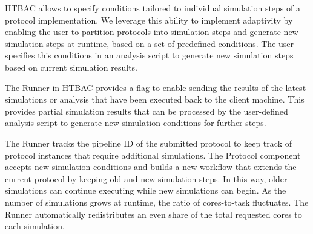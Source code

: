 HTBAC allows to specify conditions tailored to individual simulation steps of
a protocol implementation. We leverage this ability to implement adaptivity
by enabling the user to partition protocols into simulation steps and
generate new simulation steps at runtime, based on a set of predefined
conditions. The user specifies this conditions in an analysis script to
generate new simulation steps based on current simulation results.


The Runner in HTBAC provides a flag to enable sending the results of the
latest simulations or analysis that have been executed back to the client 
machine. This provides partial simulation results that can be processed by the
user-defined analysis script to generate new simulation conditions for further 
steps. 




The Runner tracks the pipeline ID of the submitted protocol to
keep track of protocol instances that require additional simulations. The
Protocol component accepts new simulation conditions and builds a new
workflow that extends the current protocol by keeping old and new simulation
steps. In this way, older simulations can continue executing while new
simulations can begin. As the number of simulations grows at runtime, the
ratio of cores-to-task fluctuates. The Runner automatically redistributes an 
even share of the total requested cores to each simulation.


